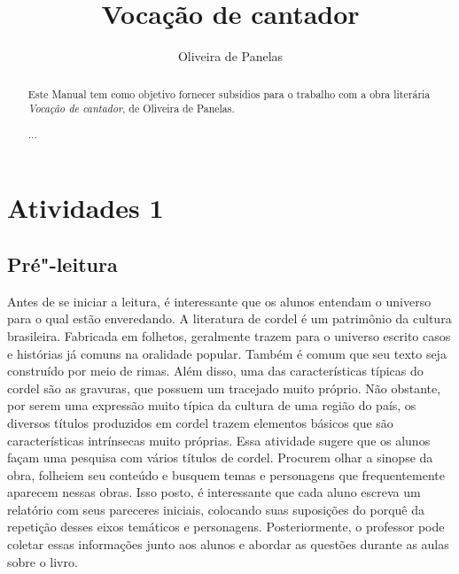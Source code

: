 \documentclass[12pt]{extarticle}
\begin{document}
\newcommand{\AutorLivro}{Oliveira de Panelas}
\newcommand{\TituloLivro}{Vocação de cantador}
\newcommand{\Tema}{Ficção, mistério e fantasia}
\newcommand{\Genero}{Poema}
\newcommand{\issnppub}{---}
\newcommand{\issnepub}{---}
\newcommand{\colaborador}{\textbf{Mariana Barrile, Bruno Gradella e Vicente Castro} é uma pessoa incrível e vai fazer um bom serviço.}


\title{\TituloLivro}
\author{\AutorLivro}
\def\authornotes{\colaborador}

\date{}
\maketitle

\begin{abstract}
Este Manual tem como objetivo fornecer subsídios para o trabalho com a
obra literária \emph{Vocação de cantador}, de Oliveira de Panelas.

...
\end{abstract}

\tableofcontents


\section{Atividades 1}


\subsection{Pré"-leitura}


Antes de se iniciar a leitura, é interessante que os alunos
entendam o universo para o qual estão enveredando. A literatura de
cordel é um patrimônio da cultura brasileira. Fabricada em folhetos,
geralmente trazem para o universo escrito casos e histórias já comuns na
oralidade popular. Também é comum que seu texto seja construído por meio
de rimas. Além disso, uma das características típicas do cordel são as
gravuras, que possuem um tracejado muito próprio. Não obstante, por
serem uma expressão muito típica da cultura de uma região do país, os
diversos títulos produzidos em cordel trazem elementos básicos que são
características intrínsecas muito próprias. Essa atividade sugere que os
alunos façam uma pesquisa com vários títulos de cordel. Procurem olhar a
sinopse da obra, folheiem seu conteúdo e busquem temas e personagens que
frequentemente aparecem nessas obras. Isso posto, é interessante que
cada aluno escreva um relatório com seus pareceres iniciais, colocando
suas suposições do porquê da repetição desses eixos temáticos e
personagens. Posteriormente, o professor pode coletar essas informações
junto aos alunos e abordar as questões durante as aulas sobre o livro.
\end{document}
